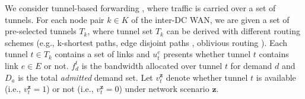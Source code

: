 \documentclass[sigconf]{acmart}
\begin{document}
We consider tunnel-based forwarding \cite{FFC,swan,Teavar}, where traffic is carried over a set of tunnels.
For each node pair $k\in K$ of the inter-DC WAN, we are given a set of pre-selected tunnels $T_{k}$, where tunnel set $T_{k}$ can be derived with different routing schemes (e.g., k-shortest paths, edge disjoint paths \cite{Bruno2013Dynamic}, oblivious routing \cite{SMORE}). 
Each tunnel $t\in T_{k}$ contains a set of links and  $u_t^e$ presents whether tunnel $t$ contains link $e\in E$ or not.
$f_d^t$ is the bandwidth allocated over tunnel $t$ for demand $d$ and 
$D_a$ is the total \textit{admitted} demand set.
Let $v_t^{\bm{z}}$ denote whether tunnel $t$ is available (i.e., $v_t^{\bm{z}}=1$)  or not  (i.e., $v_t^{\bm{z}}=0$) under network scenario $\bm{z}$.




\end{document}
